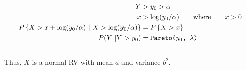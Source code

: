 \begin{enumerate}
		\begin{align}
			Y &> y_0 > \alpha \nonumber \\
			x &> \log(y_0/\alpha) \qquad \text{where} \qquad x > 0 \\
			P\left\{X > x +  \log(y_0/\alpha)\ |\ X > \log(y_0/\alpha)\right\} &= P \left\{X > x\right\} \\
			P(Y\ |Y > y_0) &= \texttt{Pareto($ y_0 $, $ \lambda $)}
		\end{align}\\
		Thus, $ X $ is a normal RV with mean $ a $ and variance $ b^2 $.\\
		
		
	
	
\end{enumerate}